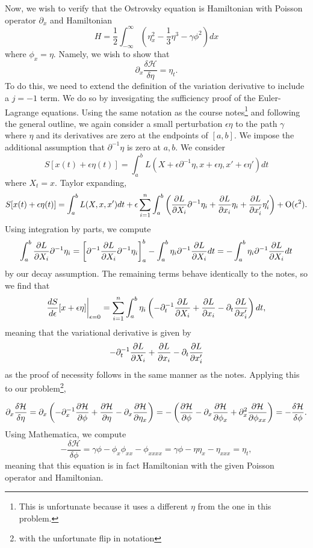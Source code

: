 \documentclass{article}
\newcommand{\p}{\partial}
\begin{document}
Now, we wish to verify that the Ostrovsky equation is Hamiltonian with Poisson operator $\p_x$ and Hamiltonian
\[
H=\frac{1}{2}\int_{-\infty}^\infty \left(\eta_x^2-\frac{1}{3}\eta^3-\gamma \phi^2\right)dx
\]
where $\phi_x=\eta$. Namely, we wish to show that 
\[
\partial_x\frac{\delta \mathcal H}{\delta \eta}=\eta_t.
\]
To do this, we need to extend the definition of the variation derivative to include a $j=-1$ term. We do so by invesigating the sufficiency proof of the Euler-Lagrange equations. Using the same notation as the course notes\footnote{This is unfortunate because it uses a different $\eta$ from the one in this problem.} and following the general outline, we again consider a small perturbation $\epsilon\eta$ to the path $\gamma$ where $\eta$ and its derivatives are zero at the endpoints of $[a,b]$. We impose the additional assumption that $\partial^{-1}\eta$ is zero at $a,b$. We consider
\[
S[x(t)+\epsilon\eta(t)]=\int_{a}^{b}L(X+\epsilon \partial^{-1}\eta,x+\epsilon\eta,x'+\epsilon\eta')dt
\]
where $X_t=x$. Taylor expanding, 
\begin{align*}
S[x(t)+\epsilon\eta(t)]=\int_{a}^{b}L(X,x,x')dt+\epsilon\sum_{i=1}^{n}\int_{a}^{b}\left(\frac{\partial L}{\partial X_i}\partial^{-1}\eta_i+\frac{\partial L}{\partial x_i}\eta_i+\frac{\partial L}{\partial x_i'}\eta_i'\right)+\operatorname{O}(\epsilon^2).
\end{align*}
Using integration by parts, we compute
\begin{align*}
\int_a^b\frac{\partial L}{\partial X_i}\partial^{-1}\eta_i=\left[\partial^{-1}\frac{\partial L}{\partial X_i}\partial^{-1}\eta_i\right]_a^b-\int_a^b\eta_i\partial^{-1}\frac{\partial L}{\partial X_i}dt=-\int_a^b\eta_i\partial^{-1}\frac{\partial L}{\partial X_i}dt
\end{align*}
by our decay assumption. The remaining terms behave identically to the notes, so we find that
\[
\frac{dS}{d\epsilon}[x+\epsilon\eta]\biggr|_{\epsilon=0}=\sum_{i=1}^{n}\int_a^b\eta_i\left(-\partial_t^{-1}\frac{\partial L}{\partial X_i}+\frac{\partial L}{\partial x_i}-\partial_t\frac{\partial L}{\partial x_i'}\right)dt,
\]
meaning that the variational derivative is given by
\[
-\partial_t^{-1}\frac{\partial L}{\partial X_i}+\frac{\partial L}{\partial x_i}-\partial_t\frac{\partial L}{\partial x_i'}
\]
as the proof of necessity follows in the same manner as the notes. Applying this to our problem\footnote{with the unfortunate flip in notation},

\begin{align*}
\partial_x\frac{\delta \mathcal H}{\delta \eta}=\partial_x\left(-\partial_x^{-1}\frac{\partial \mathcal H}{\partial \phi}+\frac{\partial \mathcal H}{\partial \eta}-\partial_x\frac{\partial \mathcal H}{\partial \eta_x}\right)=-\left(\frac{\partial \mathcal H}{\partial \phi}-\partial_x\frac{\partial \mathcal H}{\partial \phi_x}+\partial_x^2\frac{\partial \mathcal H}{\partial \phi_{xx}}\right)=-\frac{\delta \mathcal H}{\delta\phi}.
\end{align*}
Using Mathematica, we compute
\[
-\frac{\delta \mathcal H}{\delta\phi}=\gamma\phi-\phi_x\phi_{xx}-\phi_{xxxx}=\gamma\phi-\eta\eta_x-\eta_{xxx}=\eta_t,
\]
meaning that this equation is in fact Hamiltonian with the given Poisson operator and Hamiltonian.
\end{document}
